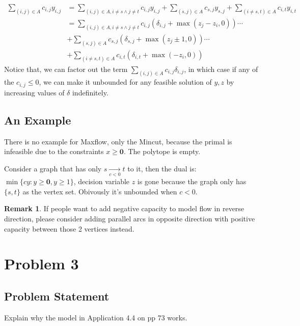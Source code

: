 \documentclass[]{article}
\theoremstyle{definition}
\newtheorem{remark}{Remark}[subsection]
\begin{document}
        \begin{align}
            \sum_{(i, j)\in A}^{}c_{i, j}y_{i, j} &= 
            \sum_{(i, j)\in A, i\neq s \wedge j \neq t}^{}  
                c_{i,j}y_{i, j} + 
            \sum_{(s, j)\in A}^{} c_{s, j} y_{s, j} + 
            \sum_{(i \neq s, t)\in A}^{}c_{i, t} y_{i, t}
            \\
            &= 
            \sum_{(i, j)\in A, i\neq s \wedge j \neq t}^{}  
                c_{i, j}(\delta_{i, j} + \max(z_j - z_i, 0))\cdots 
            \\
            & + \sum_{(s, j)\in A}^{} c_{s, j} (\delta_{s, j} + \max(z_j \pm 1, 0))\cdots
            \\
            & + \sum_{(i \neq s, t)\in A}^{}c_{i, t}(\delta_{i, t} + \max(-z_i, 0))
        \end{align}
        Notice that, we can factor out the term $\sum_{(i, j)\in A}c_{i, j}\delta_{i, j}$, in which case if any of the $c_{i, j}\le 0$, we can make it unbounded for any feasible solution of $y, z$ by increasing values of $\delta$ indefinitely. 
    \subsection{An Example}
        There is no example for Maxflow, only the Mincut, because the primal is infeasible due to the constraints $x\ge \mathbf 0$. The polytope is empty. 
        \par
        Consider a graph that has only $s \underset{c <  0}{\longrightarrow} t$ to it, then the dual is: $\min\{cy: y \ge \mathbf 0 , y \ge 1\}$, decision variable $z$ is gone because the graph only has $\{s, t\}$ as the vertex set. Obivously it's unbounded when $c < 0$. 
        \begin{remark}
            If people want to add negative capacity to model flow in reverse direction, please consider adding parallel arcs in opposite direction with positive capacity between those 2 vertices instead.
        \end{remark}

\section{Problem 3}
    \subsection{Problem Statement}
        Explain why the model in Application 4.4 on pp 73 works. 
\end{document}
